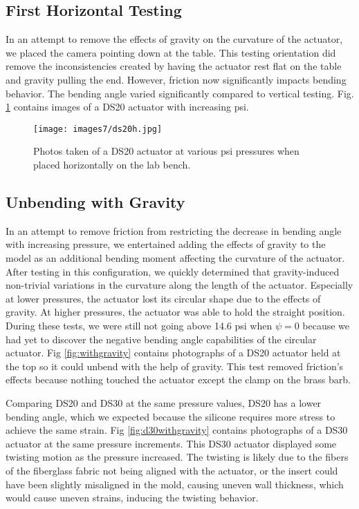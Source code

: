 \subsection{First Horizontal Testing}

In an attempt to remove the effects of gravity on the curvature of the actuator, we placed the camera pointing down at the table. This testing orientation did remove the inconsistencies created by having the actuator rest flat on the table and gravity pulling the end. However, friction now significantly impacts bending behavior. The bending angle varied significantly compared to vertical testing. Fig. \ref{fig:ds20h} contains images of a DS20 actuator with increasing psi. 

\begin{figure}[h]
    \centering
     \texttt{[image: images7/ds20h.jpg]}
    \caption{Photos taken of a DS20 actuator at various psi pressures when placed horizontally on the lab bench.}
    \label{fig:ds20h}
\end{figure}

\subsection{Unbending with Gravity}

In an attempt to remove friction from restricting the decrease in bending angle with increasing pressure, we entertained adding the effects of gravity to the model as an additional bending moment affecting the curvature of the actuator. After testing in this configuration, we quickly determined that gravity-induced non-trivial variations in the curvature along the length of the actuator. Especially at lower pressures, the actuator lost its circular shape due to the effects of gravity. At higher pressures, the actuator was able to hold the straight position. During these tests, we were still not going above 14.6 psi when $\psi=0$ because we had yet to discover the negative bending angle capabilities of the circular actuator. Fig \ref{fig:withgravity} contains photographs of a DS20 actuator held at the top so it could unbend with the help of gravity. This test removed friction's effects because nothing touched the actuator except the clamp on the brass barb. 

Comparing DS20 and DS30 at the same pressure values, DS20 has a lower bending angle, which we expected because the silicone requires more stress to achieve the same strain. Fig \ref{fig:d30withgravity} contains photographs of a DS30 actuator at the same pressure increments. This DS30 actuator displayed some twisting motion as the pressure increased. The twisting is likely due to the fibers of the fiberglass fabric not being aligned with the actuator, or the insert could have been slightly misaligned in the mold, causing uneven wall thickness, which would cause uneven strains, inducing the twisting behavior.

